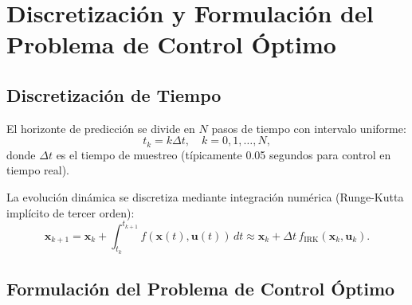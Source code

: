 \documentclass[11pt,a4paper]{article}
\begin{document}
\section{Discretización y Formulación del Problema de Control Óptimo}
\label{sec:discretization}

\subsection{Discretización de Tiempo}

El horizonte de predicción se divide en $N$ pasos de tiempo con intervalo uniforme:
\begin{equation}
    t_k = k \Delta t, \quad k = 0, 1, \ldots, N,
\end{equation}
donde $\Delta t$ es el tiempo de muestreo (típicamente 0.05 segundos para control en tiempo real).

La evolución dinámica se discretiza mediante integración numérica (Runge-Kutta implícito de tercer orden):
\begin{equation}
    \mathbf{x}_{k+1} = \mathbf{x}_k + \int_{t_k}^{t_{k+1}} f(\mathbf{x}(t), \mathbf{u}(t)) \, dt \approx \mathbf{x}_k + \Delta t \, f_{\text{IRK}}(\mathbf{x}_k, \mathbf{u}_k).
\end{equation}

\subsection{Formulación del Problema de Control Óptimo}
\end{document}

